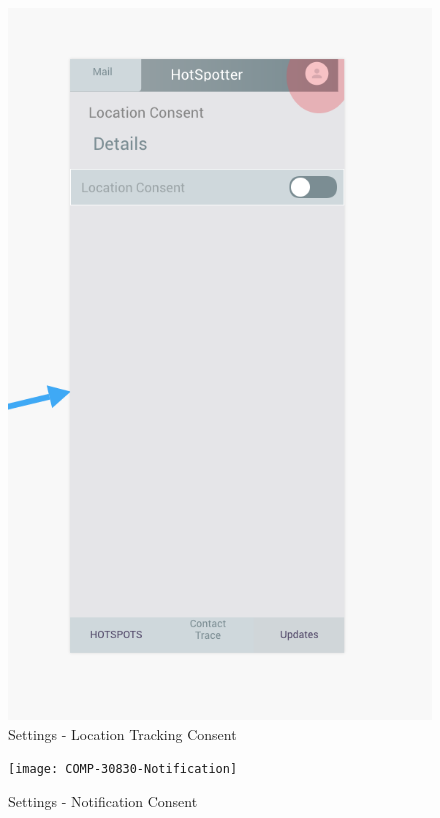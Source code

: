 \documentclass{scrreprt}
\begin{document}
\begin{figure}[H]
	\centering
	\includegraphics[page=1, width=0.9\linewidth]{COMP30830-Consent}
	\caption{Settings - Location Tracking Consent}
	\label{Consent}
\end{figure}


\begin{figure}[H]
	\centering
	\texttt{[image: COMP-30830-Notification]}
	\caption{Settings - Notification Consent}
	\label{Notification}
\end{figure}
\end{document}
